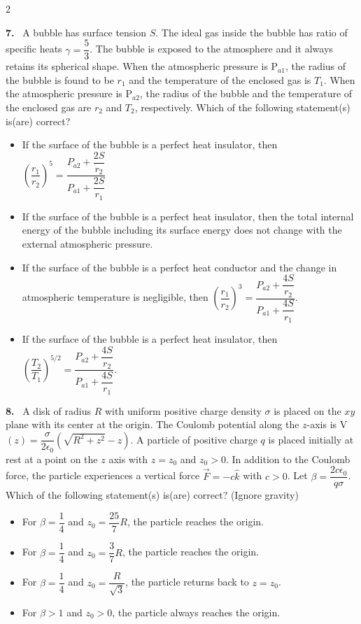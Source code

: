 \documentclass[10pt]{extarticle}
\newcommand{\qn}[1]{\par\smallskip\noindent\textbf{#1.}~}
\newenvironment{qoptions}{\begin{itemize}[leftmargin=1.8em,itemsep=1pt,topsep=2pt,label={}]}{\end{itemize}}
\newcommand{\opt}[2]{\item[(#1)] #2}
\begin{document}
\begin{multicols}{2}
\qn{7} A bubble has surface tension $S$. The ideal gas inside the bubble has ratio of specific heats $\gamma=\dfrac53$. The bubble is exposed to the atmosphere and it always retains its spherical shape. When the atmospheric pressure is P$_{a1}$, the radius of the bubble is found to be $r_1$ and the temperature of the enclosed gas is $T_1$. When the atmospheric pressure is P$_{a2}$, the radius of the bubble and the temperature of the enclosed gas are $r_2$ and $T_2$, respectively. Which of the following statement(s) is(are) correct?
\begin{qoptions}
\opt{A}{If the surface of the bubble is a perfect heat insulator, then $\left(\dfrac{r_1}{r_2}\right)^5 = \dfrac{P_{a2}+\dfrac{2S}{r_2}}{P_{a1}+\dfrac{2S}{r_1}}$}
\opt{B}{If the surface of the bubble is a perfect heat insulator, then the total internal energy of the bubble including its surface energy does not change with the external atmospheric pressure.}
\opt{C}{If the surface of the bubble is a perfect heat conductor and the change in atmospheric temperature is negligible, then $\left(\dfrac{r_1}{r_2}\right)^3 = \dfrac{P_{a2}+\dfrac{4S}{r_2}}{P_{a1}+\dfrac{4S}{r_1}}$.}
\opt{D}{If the surface of the bubble is a perfect heat insulator, then $\left(\dfrac{T_2}{T_1}\right)^{5/2} = \dfrac{P_{a2}+\dfrac{4S}{r_2}}{P_{a1}+\dfrac{4S}{r_1}}$.}
\end{qoptions}

\qn{8} A disk of radius $R$ with uniform positive charge density $\sigma$ is placed on the $xy$ plane with its center at the origin. The Coulomb potential along the $z$-axis is V$(z)=\dfrac{\sigma}{2\epsilon_0}\left(\sqrt{R^2+z^2}-z\right)$. A particle of positive charge $q$ is placed initially at rest at a point on the $z$ axis with $z=z_0$ and $z_0>0$. In addition to the Coulomb force, the particle experiences a vertical force $\vec F=-c\hat k$ with $c>0$. Let $\beta=\dfrac{2c\epsilon_0}{q\sigma}$. Which of the following statement(s) is(are) correct? (Ignore gravity)
\begin{qoptions}
\opt{A}{For $\beta=\dfrac14$ and $z_0=\dfrac{25}{7}R$, the particle reaches the origin.}
\opt{B}{For $\beta=\dfrac14$ and $z_0=\dfrac37R$, the particle reaches the origin.}
\opt{C}{For $\beta=\dfrac14$ and $z_0=\dfrac{R}{\sqrt3}$, the particle returns back to $z=z_0$.}
\opt{D}{For $\beta>1$ and $z_0>0$, the particle always reaches the origin.}
\end{qoptions}


\end{multicols}
\end{document}
